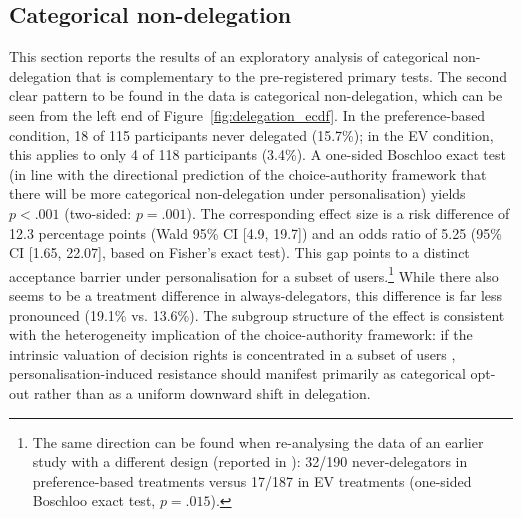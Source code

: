 \documentclass[a4paper, 12pt, fleqn]{article}
\theoremstyle{hypstyle}
\begin{document}
\subsection{Categorical non-delegation}\label{sec:nondelegation}
This section reports the results of an exploratory analysis of categorical non-delegation that is complementary to the pre-registered primary tests. The second clear pattern to be found in the data is categorical non-delegation, which can be seen from the left end of Figure~\ref{fig:delegation_ecdf}. In the preference-based condition, 18 of 115 participants never delegated (15.7\%); in the EV condition, this applies to only 4 of 118 participants (3.4\%). A one-sided Boschloo exact test (in line with the directional prediction of the choice-authority framework that there will be more categorical non-delegation under personalisation) yields $p < .001$ (two-sided: $p = .001$). The corresponding effect size is a risk difference of 12.3 percentage points (Wald 95\% CI [4.9, 19.7]) and an odds ratio of 5.25 (95\% CI [1.65, 22.07], based on Fisher's exact test). This gap points to a distinct acceptance barrier under personalisation for a subset of users.\footnote{The same direction can be found when re-analysing the data of an earlier study with a different design (reported in \citealp{suraci_2024}): 32/190 never-delegators in preference-based treatments versus 17/187 in EV treatments (one-sided Boschloo exact test, $p = .015$).} While there also seems to be a treatment difference in always-delegators, this difference is far less pronounced (19.1\% vs. 13.6\%). The subgroup structure of the effect is consistent with the heterogeneity implication of the choice-authority framework: if the intrinsic valuation of decision rights is concentrated in a subset of users \citep{Bartling2014,Owens2014}, personalisation-induced resistance should manifest primarily as categorical opt-out rather than as a uniform downward shift in delegation.
\end{document}
